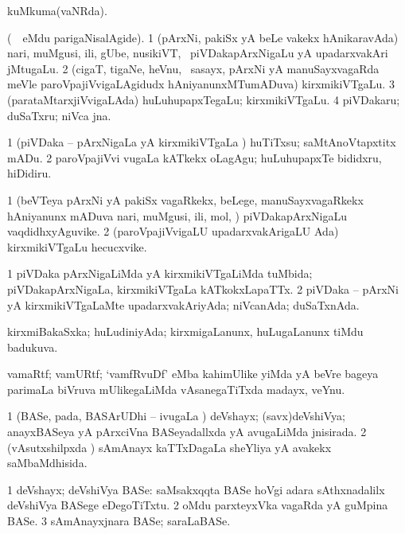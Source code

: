 {{{\bentry
{} 
\gl{\gu}
\expl{}
\bmng
 kuMkuma(vaNRda). 
\emng
\eentry

\bentry
{} 
\gl{\nA}
\expl{}
\bmng
 (\sA\ \bava\ eMdu parigaNisalAgide). 
\bnum
\num{1} (pArxNi, pakiSx yA beLe \mo vakekx hAnikaravAda) nari, muMgusi, ili, gUbe, nusikiVT, \mo\ piVDakapArxNigaLu yA upadarxvakAri jMtugaLu. 
\num{2} (cigaT, tigaNe, heVnu, \mo\ sasayx, pArxNi yA manuSayxvagaRda meVle paroVpajiVvigaLAgidudx hAniyanunxMTumADuva) kirxmikiVTgaLu. 
\num{3} (parataMtarxjiVvigaLAda) huLuhupapxTegaLu; kirxmikiVTgaLu. 
\num{4} piVDakaru; duSaTxru; niVca jna. 
\enum
\emng
\eentry

\bentry
{} 
\gl{\akirx}
\expl{}
\bmng
\bnum
\num{1} (piVDaka -- pArxNigaLa yA kirxmikiVTgaLa \vi) huTiTxsu; saMtAnoVtapxtitx mADu. 
\num{2} paroVpajiVvi \mo vugaLa kATkekx oLagAgu; huLuhupapxTe bididxru, hiDidiru. 
\enum
\emng
\eentry

\bentry
{} 
\gl{\nA}
\expl{}
\bmng
\bnum
\num{1} (beVTeya pArxNi yA pakiSx vagaRkekx, beLege, manuSayxvagaRkekx hAniyanunx mADuva nari, muMgusi, ili, mol, \mo) piVDakapArxNigaLu vaqdidhxyAguvike. 
\num{2} (paroVpajiVvigaLU upadarxvakArigaLU Ada) kirxmikiVTgaLu hecucxvike. 
\enum
\emng
\eentry

\bentry
{} 
\gl{\gu}
\expl{}
\bmng
\bnum
\num{1} piVDaka pArxNigaLiMda yA kirxmikiVTgaLiMda tuMbida; piVDakapArxNigaLa, kirxmikiVTgaLa kATkokxLapaTTx. 
\num{2} piVDaka -- pArxNi yA kirxmikiVTgaLaMte upadarxvakAriyAda; niVcanAda; duSaTxnAda. 
\enum
\emng
\eentry

\bentry
{} 
\gl{\gu}
\expl{}
\bmng
 kirxmiBakaSxka; huLudiniyAda; kirxmigaLanunx, huLugaLanunx tiMdu badukuva. 
\emng
\eentry

\bentry
{} 
\gl{\nA}
\expl{}
\bmng
 vamaRtf; vamURtf; `vamfRvuDf' eMba kahimUlike yiMda yA beVre bageya parimaLa biVruva mUlikegaLiMda vAsanegaTiTxda madayx, veYnu. 
\emng
\eentry

\bentry
{} 
\gl{\gu}
\expl{}
\bmng
\bnum
\num{1} (BASe, pada, BASArUDhi -- ivugaLa \vi) deVshayx; (savx)deVshiVya; anayxBASeya yA pArxciVna BASeyadallxda yA avugaLiMda jnisirada. 
\num{2} (vAsutxshilpxda \vi) sAmAnayx kaTTxDagaLa sheYliya yA avakekx saMbaMdhisida. 
\enum
\emng
\eentry

\bentry
{} 
\gl{\nA}
\expl{}
\bmng
\bnum
\num{1} deVshayx; deVshiVya BASe:  saMsakxqqta BASe hoVgi adara sAthxnadalilx deVshiVya BASege eDegoTiTxtu. 
\num{2} oMdu parxteyxVka vagaRda yA guMpina BASe. 
\num{3} sAmAnayxjnara BASe; saraLaBASe. 
\enum
\emng
\eentry

}}}
